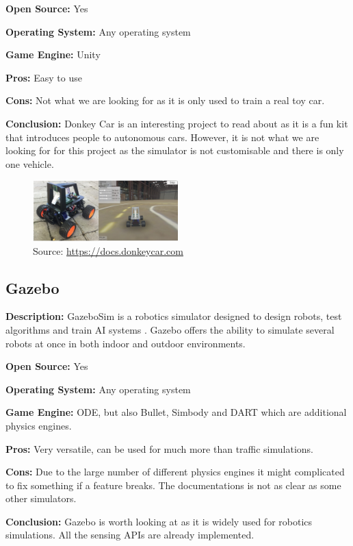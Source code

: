 \textbf{Open Source:} Yes

\textbf{Operating System:} Any operating system

\textbf{Game Engine:} Unity

\textbf{Pros:} Easy to use

\textbf{Cons:} Not what we are looking for as it is only used to train a real toy car.

\textbf{Conclusion:} Donkey Car is an interesting project to read about as it is a fun kit that introduces people to autonomous cars. However, it is not what we are looking for for this project as the simulator is not customisable and there is only one vehicle. 


\begin{figure}[H]
    \centering
    \includegraphics[width=0.5\textwidth]{Simulators/DonkeySim.jpg}
    \caption{Source: \url{https://docs.donkeycar.com}}
\end{figure}

\subsection{Gazebo}\label{gazebo}
\textbf{Description:} GazeboSim is a robotics simulator designed to design robots, test algorithms and train AI systems \cite{Gazebo_Website}. Gazebo offers the ability to simulate several robots at once in both indoor and outdoor environments.

\textbf{Open Source:} Yes

\textbf{Operating System:} Any operating system

\textbf{Game Engine:} ODE, but also Bullet, Simbody and DART which are additional physics engines. 

\textbf{Pros:} Very versatile, can be used for much more than traffic simulations. 

\textbf{Cons:} Due to the large number of different physics engines it might complicated to fix something if a feature breaks. The documentations is not as clear as some other simulators. 

\textbf{Conclusion:} Gazebo is worth looking at as it is widely used for robotics simulations. All the sensing APIs are already implemented.


